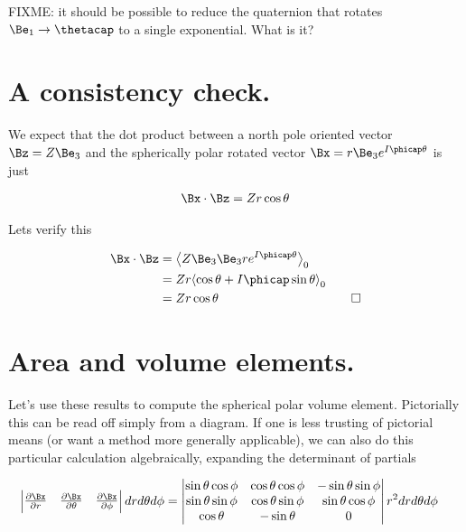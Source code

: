 FIXME: it should be possible to reduce the quaternion that rotates $\Be_1 \rightarrow \thetacap$ to a single exponential.  What is it?

\section{A consistency check.}

We expect that the dot product between a north pole oriented vector $\Bz = Z \Be_3$ and the spherically polar rotated vector $\Bx = r \Be_3 e^{I\phicap \theta}$ is just

\begin{align}\label{eqn:sphericalPolarUnit:foo13}
\Bx \cdot \Bz = Z r \cos\theta
\end{align}

Lets verify this

\begin{align*}
\Bx \cdot \Bz 
&= 
\gpgradezero{ Z \Be_3 \Be_3 r e^{I\phicap \theta}} \\
&= 
Z r \gpgradezero{ \cos\theta + I \phicap \sin\theta} \\
&= 
Z r \cos\theta &\quad\square
\end{align*}

\section{Area and volume elements.}

Let's use these results to compute the spherical polar volume element.  Pictorially this can be read off simply from a diagram.  If one is less trusting of pictorial means (or want a method more generally applicable), we can also do this particular calculation algebraically, expanding the determinant of partials

\begin{align}\label{eqn:sphericalPolarUnit:foo9}
\begin{vmatrix}
\frac{\partial \Bx}{\partial r} & \frac{\partial \Bx}{\partial \theta} & \frac{\partial \Bx}{\partial \phi} \\
\end{vmatrix} dr d\theta d\phi
&=
\begin{vmatrix}
\sin\theta \cos\phi & \cos\theta \cos\phi & -\sin\theta \sin\phi \\
\sin\theta \sin\phi & \cos\theta \sin\phi & \sin\theta \cos\phi \\
\cos\theta          & -\sin\theta         & 0                   \\
\end{vmatrix} r^2 dr d\theta d\phi
\end{align}

